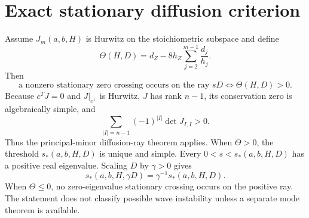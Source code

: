 \section*{Exact stationary diffusion criterion}
Assume $J_m(a,b,H)$ is Hurwitz on the stoichiometric subspace and define
\[
\Theta(H,D)=d_Z-8h_Z\sum_{j=2}^{m-1}\frac{d_j}{h_j}.
\]
Then
\[
\boxed{\text{a nonzero stationary zero crossing occurs on the ray }sD
\iff \Theta(H,D)>0.}
\]
Because $c^TJ=0$ and $J|_{c^\perp}$ is Hurwitz, $J$ has rank $n-1$, its
conservation zero is algebraically simple, and
\[
 \sum_{|I|=n-1}(-1)^{|I|}\det J_{I,I}>0.
\]
Thus the principal-minor diffusion-ray theorem applies.  When $\Theta>0$,
the threshold $s_*(a,b,H,D)$ is unique and simple.  Every
$0<s<s_*(a,b,H,D)$ has a positive real eigenvalue.  Scaling $D$ by
$\gamma>0$ gives
\[
 s_*(a,b,H,\gamma D)=\gamma^{-1}s_*(a,b,H,D).
\]
When $\Theta\le0$, no
zero-eigenvalue stationary crossing occurs on the positive ray.  The statement
does not classify possible wave instability unless a separate mode theorem is
available.
